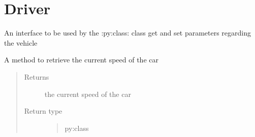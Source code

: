 \documentclass[letterpaper,10pt,english]{sphinxmanual}
\begin{document}
\ignorespaces 

\chapter{Driver}
\label{\detokenize{driver:driver}}\label{\detokenize{driver:index-0}}\label{\detokenize{driver::doc}}

\begin{fulllineitems}
\label{\detokenize{driver:lib.driver.Driver}}
An interface to be used by the :py:class:  class get and set parameters regarding
the vehicle

\begin{fulllineitems}
\label{\detokenize{driver:lib.driver.Driver.get_speed}}
A method to retrieve the current speed of the car
\begin{quote}\begin{description}
\item[{Returns}] \leavevmode
the current speed of the car

\item[{Return type}] \leavevmode
\begin{quote}\begin{description}
\item[{py:class}] \leavevmode
{}

\end{description}\end{quote}


\end{description}\end{quote}

\end{fulllineitems}



\end{fulllineitems}
\end{document}
